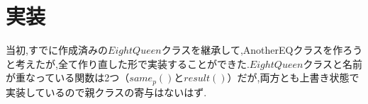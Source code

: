 \documentclass[uplatex,dvipdfmx,a4paper,11pt,oneside,openany]{jsbook}
\begin{document}
\section{実装}


当初,すでに作成済みの$EightQueen$クラスを継承して,AnotherEQクラスを作ろうと考えたが,全て作り直した形で実装することができた.$EightQueen$クラスと名前が重なっている関数は2つ（$same_p()$と$result()$）だが,両方とも上書き状態で実装しているので親クラスの寄与はないはず.
\end{document}
